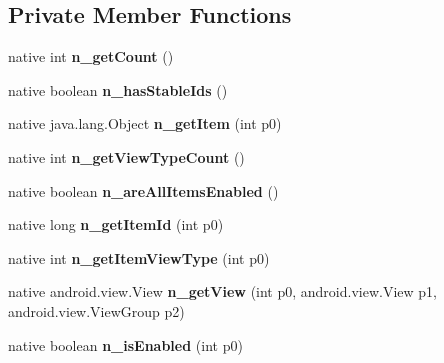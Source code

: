 \subsection*{Private Member Functions}
\begin{DoxyCompactItemize}
\item 
\mbox{\label{classmd5b60ffeb829f638581ab2bb9b1a7f4f3f_1_1ListViewAdapter_a485a5a7706d2d0127222a640ad6c6ed1}} 
native int {\bfseries n\+\_\+get\+Count} ()
\item 
\mbox{\label{classmd5b60ffeb829f638581ab2bb9b1a7f4f3f_1_1ListViewAdapter_ad237e904771e3cddb8fc13d616f17756}} 
native boolean {\bfseries n\+\_\+has\+Stable\+Ids} ()
\item 
\mbox{\label{classmd5b60ffeb829f638581ab2bb9b1a7f4f3f_1_1ListViewAdapter_a057253a34e85b6bcb44d1b3e48810c4e}} 
native java.\+lang.\+Object {\bfseries n\+\_\+get\+Item} (int p0)
\item 
\mbox{\label{classmd5b60ffeb829f638581ab2bb9b1a7f4f3f_1_1ListViewAdapter_a3cad92205015e24d5de684144a06cb39}} 
native int {\bfseries n\+\_\+get\+View\+Type\+Count} ()
\item 
\mbox{\label{classmd5b60ffeb829f638581ab2bb9b1a7f4f3f_1_1ListViewAdapter_a3180d43510a1fead4449083cc3705c54}} 
native boolean {\bfseries n\+\_\+are\+All\+Items\+Enabled} ()
\item 
\mbox{\label{classmd5b60ffeb829f638581ab2bb9b1a7f4f3f_1_1ListViewAdapter_a4d94a96e556f7fbc2b944ec3d5543f4b}} 
native long {\bfseries n\+\_\+get\+Item\+Id} (int p0)
\item 
\mbox{\label{classmd5b60ffeb829f638581ab2bb9b1a7f4f3f_1_1ListViewAdapter_a91846c130262b2cdd6b72561c12d2fde}} 
native int {\bfseries n\+\_\+get\+Item\+View\+Type} (int p0)
\item 
\mbox{\label{classmd5b60ffeb829f638581ab2bb9b1a7f4f3f_1_1ListViewAdapter_ad3eaeb9cf406b61873fb7130c1899fcb}} 
native android.\+view.\+View {\bfseries n\+\_\+get\+View} (int p0, android.\+view.\+View p1, android.\+view.\+View\+Group p2)
\item 
\mbox{\label{classmd5b60ffeb829f638581ab2bb9b1a7f4f3f_1_1ListViewAdapter_a71950e3deea7602c9d56a79ca4e18abd}} 
native boolean {\bfseries n\+\_\+is\+Enabled} (int p0)
\end{DoxyCompactItemize}
